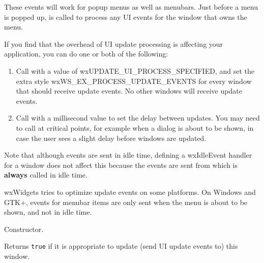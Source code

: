 These events will work for popup menus as well as menubars. Just before a menu is popped
up,  is called to process any UI events for
the window that owns the menu.

If you find that the overhead of UI update processing is affecting
your application, you can do one or both of the following:

\begin{enumerate}
\item Call  with
a value of wxUPDATE\_UI\_PROCESS\_SPECIFIED, and set the extra style
wxWS\_EX\_PROCESS\_UPDATE\_EVENTS for every window that should receive update events.
No other windows will receive update events.
\item Call  with
a millisecond value to set the delay between updates. You may need
to call  at critical
points, for example when a dialog is about to be shown, in case the user
sees a slight delay before windows are updated.
\end{enumerate}

Note that although events are sent in idle time, defining a wxIdleEvent
handler for a window does not affect this because the events are sent from  
which is {\bf always} called in idle time.

wxWidgets tries to optimize update events on some platforms. On Windows
and GTK+, events for menubar items are only sent when the menu is about
to be shown, and not in idle time.




\label{wxupdateuieventctor}


Constructor.

\label{wxupdateuieventcanupdate}


Returns {\tt true} if it is appropriate to update (send UI update events to)
this window.

